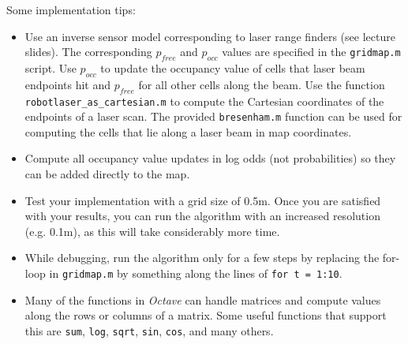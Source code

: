 \documentclass[12pt]{article}
\begin{document}
Some implementation tips:
\begin{itemize}
  \item Use an inverse sensor model corresponding to laser range finders
    (see lecture slides). The corresponding $p_{free}$ and $p_{occ}$
    values are specified in the \texttt{gridmap.m} script. Use $p_{occ}$
    to update the occupancy value of cells that laser beam endpoints hit
    and $p_{free}$ for all other cells along the beam. Use the function
    \texttt{robotlaser\_as\_cartesian.m} to compute the Cartesian
    coordinates of the endpoints of a laser scan. The provided
    \texttt{bresenham.m} function can be used for computing the cells
    that lie along a laser beam in map coordinates.
  \item
    Compute all occupancy value updates in log odds (not probabilities)
    so they can be added directly to the map.
  \item
    Test your implementation with a grid size of 0.5m. Once you are
    satisfied with your results, you can run the algorithm with an
    increased resolution (e.g. 0.1m), as this will take considerably
    more time.
  \item
    While debugging, run the algorithm only for a few steps by
    replacing the for-loop in \texttt{gridmap.m} by
    something along the lines of \texttt{for t = 1:10}.
  \item
    Many of the functions in \emph{Octave} can handle matrices and
    compute values along the rows or columns of a matrix. Some useful
    functions that support this are \texttt{sum},  \texttt{log},
    \texttt{sqrt}, \texttt{sin}, \texttt{cos}, and many others.
\end{itemize}

\end{document}
